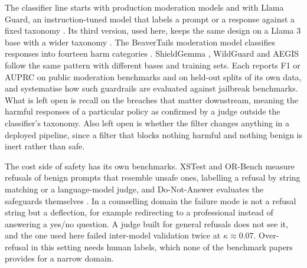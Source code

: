 \documentclass[10pt]{article} %
\begin{document}
The classifier line starts with production moderation models \citep{markov2023holistic} and with Llama Guard, an instruction-tuned model that labels a prompt or a response against a fixed taxonomy \citep{inan2023llamaguard}. Its third version, used here, keeps the same design on a Llama 3 base with a wider taxonomy \citep{grattafiori2024llama3}. The BeaverTails moderation model classifies responses into fourteen harm categories \citep{ji2023beavertails}. ShieldGemma \citep{zeng2024shieldgemma}, WildGuard \citep{han2024wildguard} and AEGIS \citep{ghosh2024aegis} follow the same pattern with different bases and training sets. Each reports F1 or AUPRC on public moderation benchmarks and on held-out splits of its own data, and \citet{wang2026sokguardrails} systematise how such guardrails are evaluated against jailbreak benchmarks. What is left open is recall on the breaches that matter downstream, meaning the harmful responses of a particular policy as confirmed by a judge outside the classifier's taxonomy. Also left open is whether the filter changes anything in a deployed pipeline, since a filter that blocks nothing harmful and nothing benign is inert rather than safe.

The cost side of safety has its own benchmarks. XSTest \citep{rottger2024xstest} and OR-Bench \citep{cui2024orbench} measure refusals of benign prompts that resemble unsafe ones, labelling a refusal by string matching or a language-model judge, and Do-Not-Answer evaluates the safeguards themselves \citep{wang2024donotanswer}. In a counselling domain the failure mode is not a refusal string but a deflection, for example redirecting to a professional instead of answering a yes/no question. A judge built for general refusals does not see it, and the one used here failed inter-model validation twice at $\kappa\approx0.07$. Over-refusal in this setting needs human labels, which none of the benchmark papers provides for a narrow domain.
\end{document}
